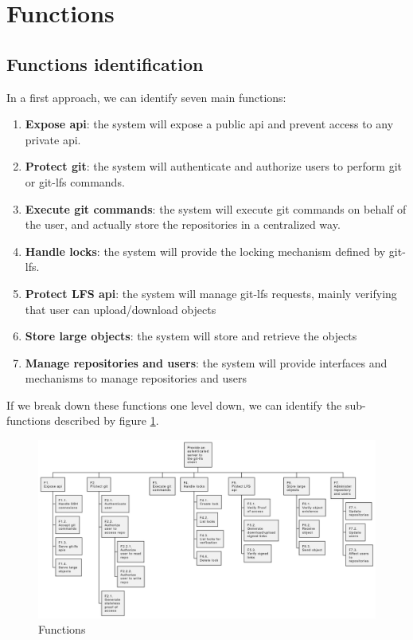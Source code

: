 \newpage
\section{Functions}

\subsection{Functions identification}

In a first approach, we can identify seven main functions:

\begin{enumerate}
    \item \textbf{Expose api}: the system will expose a public api and prevent access to any private api.
    \item \textbf{Protect git}: the system will authenticate and authorize users to perform git or git-lfs commands.
    \item \textbf{Execute git commands}: the system will execute git commands on behalf of the user, and actually store the repositories in a centralized way.
    \item \textbf{Handle locks}: the system will provide the locking mechanism defined by git-lfs.
    \item \textbf{Protect LFS api}: the system will manage git-lfs requests, mainly verifying that user can upload/download objects
    \item \textbf{Store large objects}: the system will store and retrieve the objects
    \item \textbf{Manage repositories and users}: the system will provide interfaces and mechanisms to manage repositories and users
\end{enumerate}

If we break down these functions one level down, we can identify the sub-functions described by figure \ref{fig:functions}.

\begin{figure}[h]
    \centering
    \includegraphics[width=\textwidth]{iteration_00/diagrams/functions.png}
    \caption{Functions}
    \label{fig:functions}
\end{figure}


